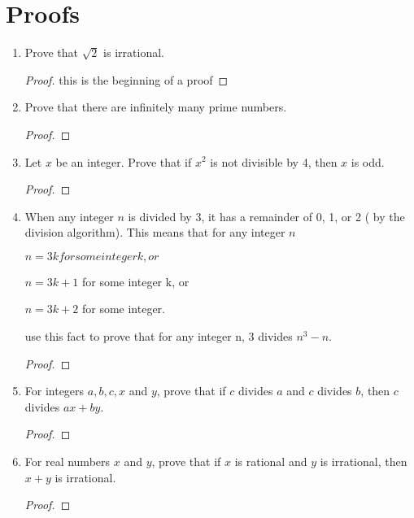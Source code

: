 \documentclass[11pt]{article}
\begin{document}
\section{Proofs}
\begin{enumerate}
    \item Prove that $\sqrt{2}$ is irrational.
        \begin{proof}
            this is the beginning of a proof
        \end{proof}
        
    \item Prove that there are infinitely many prime numbers.
        \begin{proof}
        \end{proof}
        
    \item Let $x$ be an integer. Prove that if $x^2$ is not divisible by 4, then $x$ is odd.
        \begin{proof}
        \end{proof}
        
    \item When any integer $n$ is divided by 3, it has a remainder of 0, 1, or 2 ( by the division algorithm). This means that for any integer $n$
        \begin{center}
            $n = 3k for some integer k, or$
        \end{center}
        \begin{center}
            $n = 3k+1$ for some integer k, or 
        \end{center}
        \begin{center}
            $n = 3k+2$ for some integer.
        \end{center}
    use this fact to prove that for any integer n, 3 divides $n^3 - n$.
        \begin{proof}
        \end{proof}
        
    \item For integers $a,b,c,x$ and $y$, prove that if $c$ divides $a$ and $c$ divides $b$, then $c$ divides $ax+by$.
        \begin{proof}
        \end{proof}
        
    \item For real numbers $x$ and $y$, prove that if $x$ is rational and $y$ is irrational, then $x + y$ is irrational. 
        \begin{proof}
        \end{proof}
        

\end{enumerate}
\end{document}

